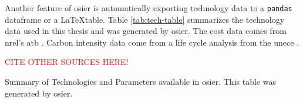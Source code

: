 Another feature of \ac{osier} is automatically exporting technology data to a
\texttt{pandas} dataframe or a \LaTeX table. Table \ref{tab:tech-table}
summarizes the technology data used in this thesis and was generated by
\ac{osier}. The cost data comes from \ac{nrel}'s \ac{atb}
\cite{national_renewable_energy_laboratory_2023_2023}. Carbon intensity data
come from a life cycle analysis from the \ac{unece}
\cite{united_nations_economic_commission_for_europe_carbon_2022}.

\textcolor{red}{CITE OTHER SOURCES HERE!}

\begin{sidewaystable}[!ht]
  \centering
  \caption{Summary of Technologies and Parameters available in \ac{osier}. This
  table was generated by \ac{osier}.}
  \label{tab:tech-table}
  \resizebox{\textheight}{!}{
  
  } %
\end{sidewaystable}

\FloatBarrier
